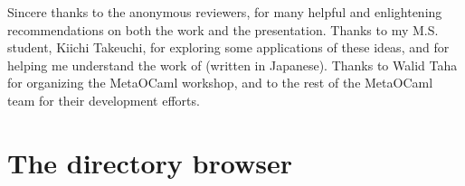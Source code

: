 \documentclass{elsart}
\def\MOC{MetaOCaml\xspace}
\begin{document}
Sincere thanks to the anonymous reviewers, for many helpful and
enlightening recommendations on both the work and the presentation.
Thanks to my M.S. student, Kiichi Takeuchi, for exploring some
applications of these ideas, and for helping me understand the work of
\citet{takebe02caching} (written in Japanese).
Thanks to Walid Taha for organizing the \MOC workshop, and to the rest
of the \MOC team for their development efforts.



\appendix
\section{The directory browser}
\label{sec:dir.meta}
\setcodefonts{11pt}{10pt}
\LGindent=8pt
\gdef\lgcommentstart{\end{lgrind}\vskip-3pt}
\def\lgcommentend{\vskip.5\baselineskip\begin{lgrind}}

\begin{lgrind}
\relax\end{lgrind}
\end{document}

